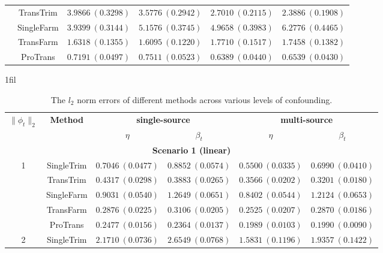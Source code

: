 \documentclass[12pt]{article}
\makeatletter
\newcommand*{\centerfloat}{%
  \parindent \z@
  \leftskip \z@ \@plus 1fil \@minus \marginparwidth
  \rightskip \leftskip
  \parfillskip \z@skip}
\makeatother
\begin{document}
\begin{table}[!ht]
\begin{tabular}{cccccc}
        & TransTrim    & $3.9866\ (0.3298)$ & $3.5776\ (0.2942)$ & $2.7010\ (0.2115)$ & $2.3886\ (0.1908)$ \\
        & SingleFarm  & $3.9399\ (0.3144)$ & $5.1576\ (0.3745)$ & $4.9658\ (0.3983)$ & $6.2776\ (0.4465)$ \\
        & TransFarm   & $1.6318\ (0.1355)$ & $1.6095\ (0.1220)$ & $1.7710\ (0.1517)$ & $1.7458\ (0.1382)$ \\
        & ProTrans    & $\bm{0.7191}\ (0.0497)$  & $\bm{0.7511}\ (0.0523)$  & $\bm{0.6389}\ (0.0440)$ & $\bm{0.6539}\ (0.0430)$ \\
        \bottomrule
    \end{tabular}
\end{table}


\begin{table}[!ht]
\renewcommand{\arraystretch}{0.6}
\footnotesize
    \centerfloat
    \caption{The $l_2$ norm errors of different methods across various levels of confounding.}
    \label{tab:sup:l2_norm_phi}
    \begin{tabular}{cccccc}
        \toprule
        \multirow{2}{*}{$\|\phi_t\|_2$} & \multirow{2}{*}{\textbf{Method}} & \multicolumn{2}{c}{\textbf{single-source}} & \multicolumn{2}{c}{\textbf{multi-source}}\\
        \cmidrule(lr){3-4} \cmidrule(lr){5-6} 
        & & $\eta$ & $\beta_{t}$ & $\eta$& $\beta_{t}$ \\
        \midrule
        \multicolumn{6}{c}{\textbf{Scenario 1 (linear)}}\\
        \hline
        \multirow{5}{*}{1} 
        & SingleTrim  & $0.7046\ (0.0477)$ & $0.8852\ (0.0574)$ & $0.5500\ (0.0335)$ & $0.6990\ (0.0410)$ \\
        & TransTrim   & $0.4317\ (0.0298)$ & $0.3883\ (0.0265)$ & $0.3566\ (0.0202)$ & $0.3201\ (0.0180)$ \\
        & SingleFarm  & $0.9031\ (0.0540)$ & $1.2649\ (0.0651)$ & $0.8402\ (0.0544)$ & $1.2124\ (0.0653)$ \\
        & TransFarm   & $0.2876\ (0.0225)$ & $0.3106\ (0.0205)$ & $0.2525\ (0.0207)$ & $0.2870\ (0.0186)$ \\
        & ProTrans    & $\bm{0.2477}\ (0.0156)$ & $\bm{0.2364}\ (0.0137)$ & $\bm{0.1989}\ (0.0103)$ & $\bm{0.1990}\ (0.0090)$ \\
        \hline
        \multirow{5}{*}{2} 
        & SingleTrim  & $2.1710\ (0.0736)$ & $2.6549\ (0.0768)$ & $1.5831\ (0.1196)$ & $1.9357\ (0.1422)$  \\

\end{tabular}
\end{table}
\end{document}
